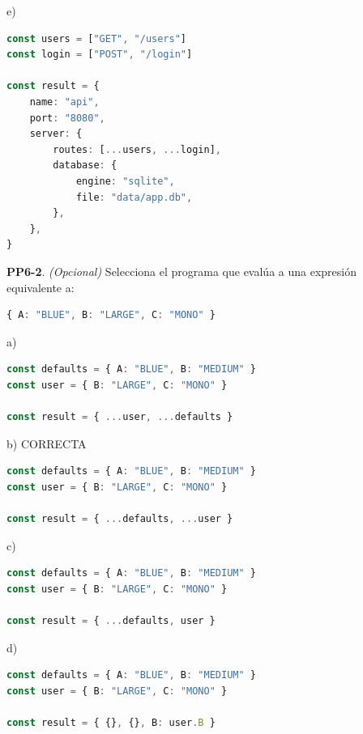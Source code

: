 \begin{opcion}{e)}
\begin{lstlisting}[language=TypeScript]
const users = ["GET", "/users"]
const login = ["POST", "/login"]

const result = {
    name: "api",
    port: "8080",
    server: {
        routes: [...users, ...login],
        database: {
            engine: "sqlite",
            file: "data/app.db",
        },
    },
}
\end{lstlisting}
\end{opcion}

\textbf{PP6-2}. \emph{(Opcional)} Selecciona el programa que evalúa a una expresión equivalente a:

\begin{bloquecodigo}
\begin{lstlisting}[language=TypeScript]
{ A: "BLUE", B: "LARGE", C: "MONO" }
\end{lstlisting}
\end{bloquecodigo}

\begin{opcion}{a)}
\begin{lstlisting}[language=TypeScript]
const defaults = { A: "BLUE", B: "MEDIUM" }
const user = { B: "LARGE", C: "MONO" }

const result = { ...user, ...defaults }
\end{lstlisting}
\end{opcion}

\begin{opcion}{b)}
CORRECTA
\begin{lstlisting}[language=TypeScript]
const defaults = { A: "BLUE", B: "MEDIUM" }
const user = { B: "LARGE", C: "MONO" }

const result = { ...defaults, ...user }
\end{lstlisting}
\end{opcion}

\begin{opcion}{c)}
\begin{lstlisting}[language=TypeScript]
const defaults = { A: "BLUE", B: "MEDIUM" }
const user = { B: "LARGE", C: "MONO" }

const result = { ...defaults, user }
\end{lstlisting}
\end{opcion}

\begin{opcion}{d)}
\begin{lstlisting}[language=TypeScript]
const defaults = { A: "BLUE", B: "MEDIUM" }
const user = { B: "LARGE", C: "MONO" }

const result = { {}, {}, B: user.B }
\end{lstlisting}
\end{opcion}

